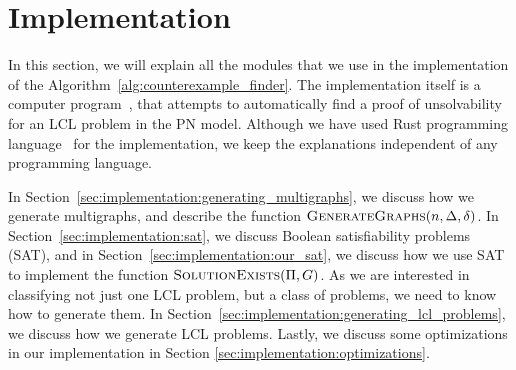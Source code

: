 
\section{Implementation} \label{sec:implementation}
In this section, we will explain all the modules that we use in the implementation of the Algorithm~\ref{alg:counterexample_finder}.
The implementation itself is a computer program~\cite{NonconstantLclClassifier2022}, that attempts to automatically find a proof of unsolvability for an LCL problem in the PN model.
Although we have used Rust programming language~\cite{RustLang} for the implementation, we keep the explanations independent of any programming language.

In Section~\ref{sec:implementation:generating_multigraphs}, we discuss how we generate multigraphs, and describe the function $\textsc{GenerateGraphs}(n, \Delta, \delta)$.
In Section~\ref{sec:implementation:sat}, we discuss Boolean satisfiability problems (SAT), and in Section~\ref{sec:implementation:our_sat}, we discuss how we use SAT to implement the function $\textsc{SolutionExists}(\Pi, G)$.
As we are interested in classifying not just one LCL problem, but a class of problems, we need to know how to generate them.
In Section~\ref{sec:implementation:generating_lcl_problems}, we discuss how we generate LCL problems.
Lastly, we discuss some optimizations in our implementation in Section \ref{sec:implementation:optimizations}.


